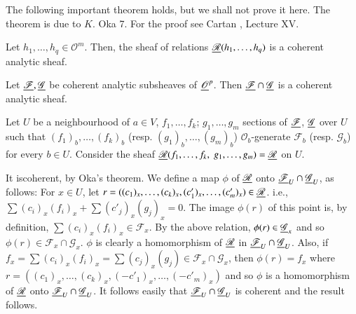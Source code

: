 The following important theorem holds, but we shall not prove it
here. The theorem is due to $K$. Oka 7. For the proof see Cartan
\cite{p3:key2}, \cite{p3:key3} Lecture XV.


\medskip
{}
Let $h_1, \ldots, h_q \in \mathscr{O}^m$. Then, the sheaf of relations
$\underline{\mathscr{R}}(h_1, \ldots, h_q)$ is a coherent analytic sheaf.

\begin{coro*}
Let $\underline{\mathscr{F}}, \underline{\mathscr{G}}$ be coherent analytic subsheaves
of $\underline{\mathscr{O}}^p$. Then $\underline{\mathscr{F}} \cap \underline{\mathscr{G}}$ is
a coherent analytic sheaf.
\end{coro*}

\medskip
{}
Let $U$ be a neighbourhood of $a \in V$, $f_1, \ldots, f_k$; $g_1,
\ldots, g_m$ sections of $\underline{\mathscr{F}}$, $\underline{\mathscr{G}}$ over $U$
such that $(f_1)_b, \ldots, (f_k)_b$ (resp. $(g_1)_b, \ldots,
(g_m)_b$) $\mathscr{O}_b$-generate $\mathscr{F}_b$
(resp. $\mathscr{G}_b$) for every $b \in U$. Consider the sheaf
$\underline{\mathscr{R}} (f_1, \ldots, f_k, \; g_1, \ldots, g_m) =
\underline{\mathscr{R}}$ on $U$. 

It is\pageoriginale coherent, by Oka's theorem. We define a map $\phi$
of $\underline{\mathscr{R}}$ onto $\underline{\mathscr{F}}_U \cap \underline{\mathscr{G}}_U$, as
follows: For $x \in U$, let $r = ((c_1)_x, \ldots, (c_k)_x, (c'_1)_x ,
\ldots, (c'_m)_x) \in \underline{\mathscr{R}}$. i.e., $\sum (c_i)_x (f_i)_x +
\sum (c'_j)_x (g_j)_x = 0$. The image $\phi(r)$ of this point is, by
definition, $\sum(c_i)_x (f_i)_x \in \mathscr{F}_x$. By the above
relation, $\phi (r) \in \underline{\mathscr{G}}_x$ and so $\phi(r) \in
\mathscr{F}_x \cap \mathscr{G}_x$. $\phi$ is clearly a homomorphism of
$\underline{\mathscr{R}}$ in $\underline{\mathscr{F}}_U \cap \underline{\mathscr{G}}_U$. Also,
if $f_x = \sum (c_i)_x (f_i)_x = \sum (c_j)_x (g_j) \in\mathscr{F}_x
\cap \mathscr{G}_x$, then $\phi(r) = f_x$ where $r = ((c_1)_x, \ldots,
(c_k)_x, (-c'_1)_x, \ldots, (-c'_m)_x)$ and so $\phi$ is a
homomorphism of $\underline{\mathscr{R}}$ onto $\underline{\mathscr{F}}_U \cap
\underline{\mathscr{G}}_U$. It follows easily that $\underline{\mathscr{F}}_U \cap
\underline{\mathscr{G}}_U$ is coherent and the result follows.

